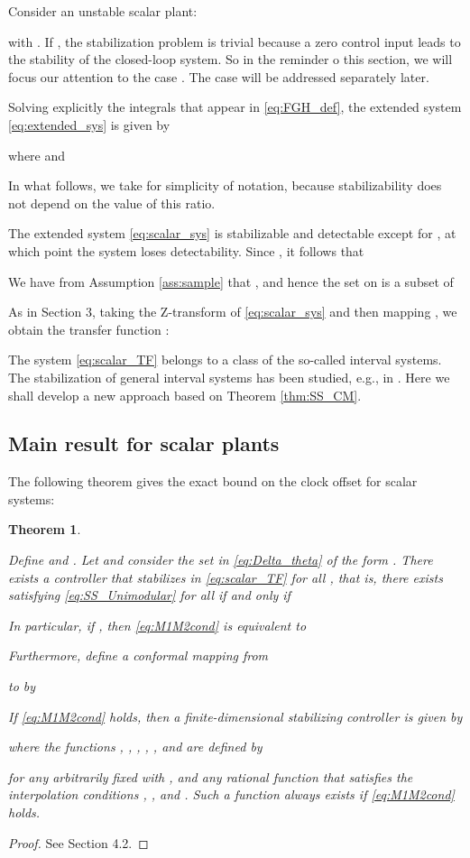 \documentclass[letterpaper, 12pt, draftcls, onecolumn]{ieeeconf}
\newtheorem{theorem}{Theorem}[section]
\begin{document}
Consider an unstable scalar plant:
 
with .
If , the stabilization problem is trivial because a
zero control input  leads to the stability of the closed-loop system.
So in the reminder o this section, 
we will focus our attention to the case .
The case  will be addressed separately later.

Solving explicitly the integrals that appear in \eqref{eq:FGH_def},
the extended system \eqref{eq:extended_sys} is given by

where
 and

In what follows, we take  for simplicity of notation,
because stabilizability does not depend on the value of this ratio.


The extended system \eqref{eq:scalar_sys}
is stabilizable and detectable except for , at which
point the system loses detectability. 
Since , 
it follows that 

We have from Assumption \ref{ass:sample} 
that , and hence
the set  on  is a subset of


As in Section 3,
taking the Z-transform of
\eqref{eq:scalar_sys} and then
mapping , we obtain the transfer function :

The system \eqref{eq:scalar_TF}
belongs to a class of the so-called interval systems.
The stabilization of general interval systems
has been studied, e.g., in
\cite{Ghosh1988, Olbrot1994}.
Here we shall develop a new approach based on
Theorem \ref{thm:SS_CM}.

\subsection{Main result for scalar plants}
The following theorem gives the exact bound on the 
clock offset for scalar systems:
\begin{theorem}
	\label{thm:scalar_LTIcontroller}
	{\it
Define  and .
		Let  and 
		consider the set  in \eqref{eq:Delta_theta} of the form
		.
		There exists a controller that stabilizes 
		 in \eqref{eq:scalar_TF} 
		for all , that is,
		there exists  satisfying
		\eqref{eq:SS_Unimodular} for all 
		if and only if
		
		In particular, if , then \eqref{eq:M1M2cond}
		is equivalent to
		
		
		Furthermore, 
		define a conformal mapping  from
		
		to 
		 by
		
		If \eqref{eq:M1M2cond} holds, then
		a finite-dimensional stabilizing controller  is given by 
		
		where the  functions 
		, , , , , and  are defined by
		
		for any arbitrarily fixed  with , and
		any rational function 
		 that satisfies
		the interpolation conditions ,
		, and .
		Such a function  always exists if \eqref{eq:M1M2cond} holds.
	}
\end{theorem}
\begin{proof}
	See Section 4.2.
\end{proof}
\end{document}
